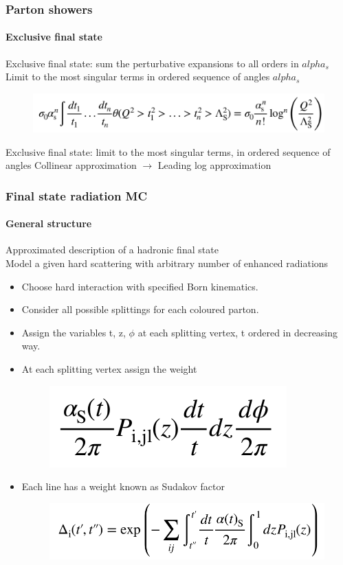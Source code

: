 \documentclass[aspectratio=43]{beamer}
\begin{document}
\begin{frame}
	
	\frametitle{Parton showers}
	\framesubtitle{Exclusive final state}
	
	\footnotesize Exclusive final state: sum the perturbative expansions to all orders in $alpha_s$ \\
	\footnotesize Limit to the most singular terms in ordered sequence of angles $alpha_s$
	
	\begin{figure}
		\includegraphics[width = 9 cm]{plots/exclusive_ll.png}
	\end{figure}
	
	\footnotesize Exclusive final state: limit to the most singular terms, in ordered sequence of angles
	\color{red} Collinear approximation $\longrightarrow$ Leading log approximation

\end{frame}

\begin{frame}

	\frametitle{Final state radiation MC}
	\framesubtitle{General structure}
	
	\footnotesize Approximated description of a hadronic final state \\
	\footnotesize Model a given hard scattering with arbitrary number of enhanced radiations

	\begin{itemize} 
		\item Choose hard interaction with specified Born kinematics.
		\item Consider all possible splittings for each coloured parton.
		\item Assign the variables t, z, $\phi$ at each splitting vertex, t ordered in decreasing way.
		\item At each splitting vertex assign the weight 
		\begin{figure}
			\includegraphics[width = 2.5 cm]{plots/AP_weight.png}
		\end{figure}
		\item Each line has a weight known as Sudakov factor
		\begin{figure}
			\includegraphics[width = 6 cm]{plots/sudakov.png}
		\end{figure}
	\end{itemize}

\end{frame}
\end{document}
